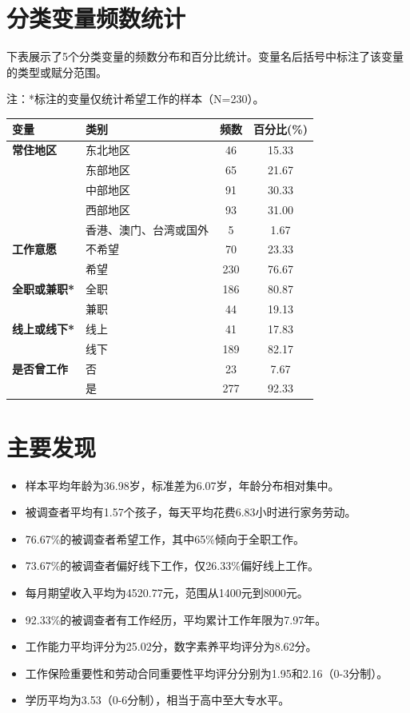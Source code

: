 \documentclass[12pt,a4paper]{article}
\begin{document}
\section{分类变量频数统计}

下表展示了5个分类变量的频数分布和百分比统计。变量名后括号中标注了该变量的类型或赋分范围。

注：*标注的变量仅统计希望工作的样本（N=230）。

\begin{table}[htbp]
\centering
\begin{tabular}{llcc}
\toprule
\textbf{变量} & \textbf{类别} & \textbf{频数} & \textbf{百分比(\%)} \\
\midrule
\textbf{常住地区} & 东北地区 & 46 & 15.33 \\
 & 东部地区 & 65 & 21.67 \\
 & 中部地区 & 91 & 30.33 \\
 & 西部地区 & 93 & 31.00 \\
 & 香港、澳门、台湾或国外 & 5 & 1.67 \\
\midrule
\textbf{工作意愿} & 不希望 & 70 & 23.33 \\
 & 希望 & 230 & 76.67 \\
\midrule
\textbf{全职或兼职*} & 全职 & 186 & 80.87 \\
 & 兼职 & 44 & 19.13 \\
\midrule
\textbf{线上或线下*} & 线上 & 41 & 17.83 \\
 & 线下 & 189 & 82.17 \\
\midrule
\textbf{是否曾工作} & 否 & 23 & 7.67 \\
 & 是 & 277 & 92.33 \\
\bottomrule
\end{tabular}
\end{table}


\section{主要发现}

\begin{itemize}
    \item 样本平均年龄为36.98岁，标准差为6.07岁，年龄分布相对集中。
    \item 被调查者平均有1.57个孩子，每天平均花费6.83小时进行家务劳动。
    \item 76.67\%的被调查者希望工作，其中65\%倾向于全职工作。
    \item 73.67\%的被调查者偏好线下工作，仅26.33\%偏好线上工作。
    \item 每月期望收入平均为4520.77元，范围从1400元到8000元。
    \item 92.33\%的被调查者有工作经历，平均累计工作年限为7.97年。
    \item 工作能力平均评分为25.02分，数字素养平均评分为8.62分。
    \item 工作保险重要性和劳动合同重要性平均评分分别为1.95和2.16（0-3分制）。
    \item 学历平均为3.53（0-6分制），相当于高中至大专水平。
\end{itemize}
\end{document}
